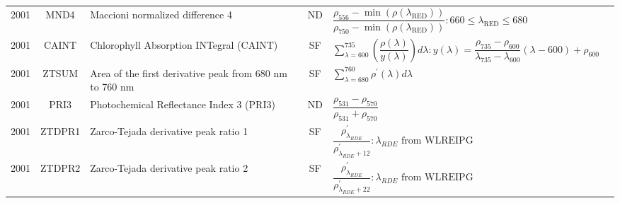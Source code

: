 \documentclass[10pt]{article}
\begin{document}
\begin{ThreePartTable}
\begin{longtable}{c c m{2.3in} c M{2.8in} M{1.5in}}
  2001 & MND4    & Maccioni normalized difference 4                                               & ND & $\dfrac{\rho_{556}-\min(\rho(\lambda_\text{RED}))}{\rho_{750}-\min(\rho(\lambda_\text{RED}))} : 660\le\lambda_\text{RED}\le680$                                                                                                                                                         & \citet{Maccioni2001}                                \\
  2001 & CAINT   & Chlorophyll Absorption INTegral (CAINT)                                        & SF & $\sum\limits_{\lambda=600}^{735}\left(\dfrac{\rho(\lambda)}{y(\lambda)}\right)d\lambda : y(\lambda)=\dfrac{\rho_{735}-\rho_{600}}{\lambda_{735}-\lambda_{600}}(\lambda-600)+\rho_{600}$                                                                                                 & \citet{Oppelt2001,Oppelt2004}                       \\
  2001 & ZTSUM   & Area of the first derivative peak from 680 nm to 760 nm                        & SF & $\sum\limits_{\lambda=680}^{760}\rho^\prime(\lambda)d\lambda$                                                                                                                                                                                                                           & \citet{Zarco-Tejada2001b}                           \\
  2001 & PRI3    & Photochemical Reflectance Index 3 (PRI3)                                       & ND & $\dfrac{\rho_{531}-\rho_{570}}{\rho_{531}+\rho_{570}}$                                                                                                                                                                                                                                  & \citet{Zarco-Tejada2001b}                           \\
  2001 & ZTDPR1  & Zarco-Tejada derivative peak ratio 1                                           & SF & $\dfrac{\rho^\prime_{\lambda_{RDE}}}{\rho^\prime_{\lambda_{RDE}+12}} : \lambda_{RDE} \text{ from WLREIPG}$                                                                                                                                                                              & \citet{Zarco-Tejada2001b,Miller1990}                \\
  2001 & ZTDPR2  & Zarco-Tejada derivative peak ratio 2                                           & SF & $\dfrac{\rho^\prime_{\lambda_{RDE}}}{\rho^\prime_{\lambda_{RDE}+22}} : \lambda_{RDE} \text{ from WLREIPG}$                                                                                                                                                                              & \citet{Zarco-Tejada2001b,Miller1990}                \\

\end{longtable}
\end{ThreePartTable}
\end{document}
